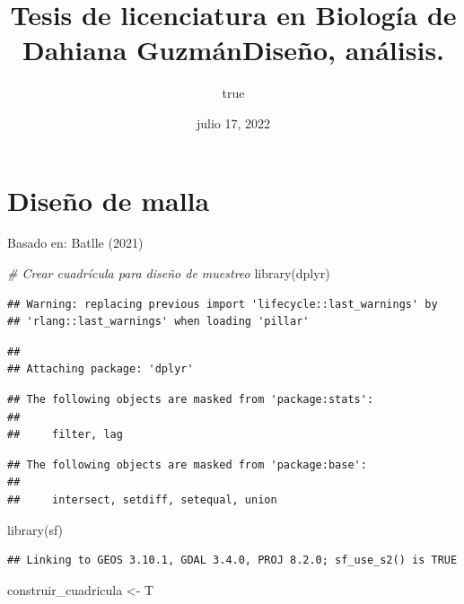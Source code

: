 \documentclass[
  11pt,
]{article}
\title{Tesis de licenciatura en Biología de Dahiana GuzmánDiseño,
análisis.}
\author{true}
\date{julio 17, 2022}
\newenvironment{Shaded}{\begin{snugshade}}{\end{snugshade}}
\newcommand{\CommentTok}[1]{\textcolor[rgb]{0.56,0.35,0.01}{\textit{#1}}}
\newcommand{\FunctionTok}[1]{\textcolor[rgb]{0.00,0.00,0.00}{#1}}
\newcommand{\NormalTok}[1]{#1}
\newcommand{\OtherTok}[1]{\textcolor[rgb]{0.56,0.35,0.01}{#1}}
\begin{document}
\maketitle

\hypertarget{diseuxf1o-de-malla}{%
\section{Diseño de malla}\label{diseuxf1o-de-malla}}

Basado en: Batlle (2021)

\begin{Shaded}
\begin{Highlighting}[]
\CommentTok{\# Crear cuadrícula para diseño de muestreo}
\FunctionTok{library}\NormalTok{(dplyr)}
\end{Highlighting}
\end{Shaded}

\begin{verbatim}
## Warning: replacing previous import 'lifecycle::last_warnings' by
## 'rlang::last_warnings' when loading 'pillar'
\end{verbatim}

\begin{verbatim}
## 
## Attaching package: 'dplyr'
\end{verbatim}

\begin{verbatim}
## The following objects are masked from 'package:stats':
## 
##     filter, lag
\end{verbatim}

\begin{verbatim}
## The following objects are masked from 'package:base':
## 
##     intersect, setdiff, setequal, union
\end{verbatim}

\begin{Shaded}
\begin{Highlighting}[]
\FunctionTok{library}\NormalTok{(sf)}
\end{Highlighting}
\end{Shaded}

\begin{verbatim}
## Linking to GEOS 3.10.1, GDAL 3.4.0, PROJ 8.2.0; sf_use_s2() is TRUE
\end{verbatim}

\begin{Shaded}
\begin{Highlighting}[]
\NormalTok{construir\_cuadricula }\OtherTok{\textless{}{-}}\NormalTok{ T}
\end{Highlighting}
\end{Shaded}
\end{document}

